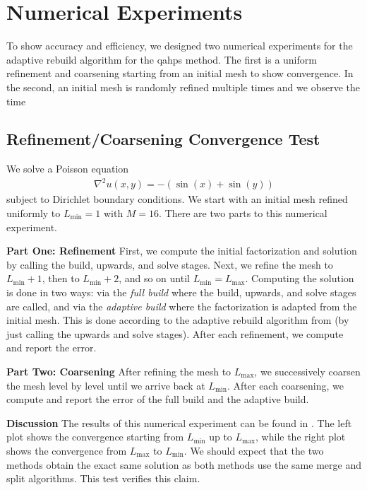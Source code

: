 \section{Numerical Experiments}

To show accuracy and efficiency, we designed two numerical experiments for the adaptive rebuild algorithm for the \gls{qahps} method. The first is a uniform refinement and coarsening starting from an initial mesh to show convergence. In the second, an initial mesh is randomly refined multiple times and we observe the time 

\subsection{Refinement/Coarsening Convergence Test}
\label{sub:refinement-coarsening-test}

We solve a Poisson equation
\begin{align}
    \nabla^2 u(x, y) = -(\sin(x) + \sin(y))
\end{align}
subject to Dirichlet boundary conditions. We start with an initial mesh refined uniformly to $L_{\text{min}} = 1$ with $M = 16$. There are two parts to this numerical experiment.

{\bf Part One: Refinement} 
First, we compute the initial factorization and solution by calling the build, upwards, and solve stages. Next, we refine the mesh to $L_{\text{min}} + 1$, then to $L_{\text{min}} + 2$, and so on until $L_{\text{min}} = L_{\text{max}}$. Computing the solution is done in two ways: via the {\em full build} where the build, upwards, and solve stages are called, and via the {\em adaptive build} where the factorization is adapted from the initial mesh. This is done according to the adaptive rebuild algorithm from  (by just calling the upwards and solve stages). After each refinement, we compute and report the error.

{\bf Part Two: Coarsening}
After refining the mesh to $L_{\text{max}}$, we successively coarsen the mesh level by level until we arrive back at $L_{\text{min}}$. After each coarsening, we compute and report the error of the full build and the adaptive build.

{\bf Discussion}
The results of this numerical experiment can be found in . The left plot shows the convergence starting from $L_{\text{min}}$ up to $L_{\text{max}}$, while the right plot shows the convergence from $L_{\text{max}}$ to $L_{\text{min}}$. We should expect that the two methods obtain the exact same solution as both methods use the same merge and split algorithms. This test verifies this claim.

